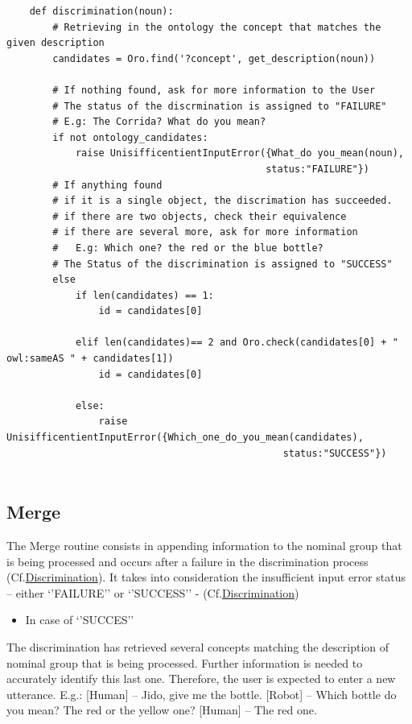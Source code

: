 \documentclass[twoside,a4paper,10pt]{report}
\begin{document}
\lstset{language=python}
\begin{lstlisting}
    def discrimination(noun):
        # Retrieving in the ontology the concept that matches the given description
        candidates = Oro.find('?concept', get_description(noun))
        
        # If nothing found, ask for more information to the User
        # The status of the discrmination is assigned to "FAILURE"
        # E.g: The Corrida? What do you mean?
        if not ontology_candidates:
            raise UnisifficentientInputError({What_do you_mean(noun), 
                                             status:"FAILURE"})
        # If anything found
        # if it is a single object, the discrimation has succeeded. 
        # if there are two objects, check their equivalence
        # if there are several more, ask for more information
        #   E.g: Which one? the red or the blue bottle?
        # The Status of the discrimination is assigned to "SUCCESS" 
        else
            if len(candidates) == 1:
                id = candidates[0]
                
            elif len(candidates)== 2 and Oro.check(candidates[0] + " owl:sameAS " + candidates[1])
                id = candidates[0]
                
            else:
                raise UnisifficentientInputError({Which_one_do_you_mean(candidates), 
                                                status:"SUCCESS"})
                

\end{lstlisting}

\subsection{Merge}
\label{65464c31b2e6ac04da1fcaa37c9bd9c7}%

The Merge routine consists in appending information to the nominal group that is being processed and occurs after a failure in the discrimination process (Cf.\hyperref[974418acf6ac4871b739b9591436865a]{Discrimination}).
It takes into consideration the insufficient input error status – either ‘’FAILURE’’ or ‘’SUCCESS’’ - (Cf.\hyperref[974418acf6ac4871b739b9591436865a]{Discrimination})



\begin{itemize}
    \item  In case of ‘’SUCCES’’
\end{itemize}
The discrimination has retrieved several concepts matching the description of nominal group that is being processed. Further information is needed to accurately identify this last one. Therefore, the user is expected to enter a new utterance.
E.g.: 
[Human] – Jido, give me the bottle.
[Robot] – Which bottle do you mean? The red or the yellow one?
[Human] – The red one. 
\end{document}
